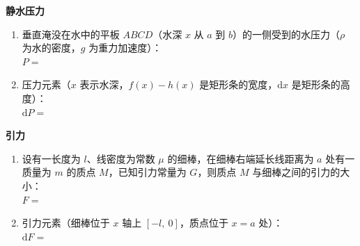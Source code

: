 \documentclass[a4paper,12pt]{article}
\begin{document}
    \begin{minipage}[t]{0.46\textwidth}

        \textbf{静水压力}
        \begin{enumerate}[label=(\arabic*), leftmargin=2em, itemsep=1.2em]
            \item 垂直淹没在水中的平板 $ABCD$（水深 $x$ 从 $a$ 到 $b$）的一侧受到的水压力（$\rho$ 为水的密度，$g$ 为重力加速度）：\\[1.5em] $P = $\vspace{2.2em}
            \item 压力元素（$x$ 表示水深，$f(x) - h(x)$ 是矩形条的宽度，$\mathrm{d}x$ 是矩形条的高度）：\\[1.5em] $\mathrm{d}P = $\vspace{2.2em}
        \end{enumerate}

        \textbf{引力}
        \begin{enumerate}[label=(\arabic*), leftmargin=2em, itemsep=1.2em]
            \item 设有一长度为 $l$、线密度为常数 $\mu$ 的细棒，在细棒右端延长线距离为 $a$ 处有一质量为 $m$ 的质点 $M$，已知引力常量为 $G$，则质点 $M$ 与细棒之间的引力的大小：\\[1.5em] $F = $\vspace{2.2em}
            \item 引力元素（细棒位于 $x$ 轴上 $[-l,\ 0]$，质点位于 $x = a$ 处）：\\[1.5em] $\mathrm{d}F = $\vspace{2.2em}
        \end{enumerate}
    \end{minipage}
    \hfill
\end{document}
